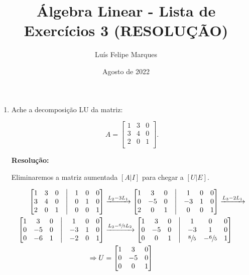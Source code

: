 \documentclass[leqno]{article}
\title{Álgebra Linear - Lista de Exercícios 3 (RESOLUÇÃO)}
\author{Luís Felipe Marques}
\date{Agosto de 2022}
\begin{document}
 
\maketitle

\begin{enumerate}
    \item Ache a decomposição LU da matriz:
    
    $$A=\begin{bmatrix}
    1 & 3 & 0\\
    3 & 4 & 0\\
    2 & 0 & 1\\
    \end{bmatrix}\text{.}$$
    
    \textbf{Resolução:}

    Eliminaremos a matriz aumentada $[A|I]$ para chegar a $[U|E]$.
    
    \begin{align*}
    \begin{bmatrix}
    1 & 3 & 0 & \bigm| & 1 & 0 & 0\\
    3 & 4 & 0 & \bigm| & 0 & 1 & 0\\
    2 & 0 & 1 & \bigm| & 0 & 0 & 1\\
    \end{bmatrix}&\xrightarrow{L_2-3L_1}\begin{bmatrix}
    1 & 3 & 0 & \bigm| & 1 & 0 & 0\\
    0 & -5 & 0 & \bigm| & -3 & 1 & 0\\
    2 & 0 & 1 & \bigm| & 0 & 0 & 1\\
    \end{bmatrix}\xrightarrow{L_3-2L_1}\\
    \begin{bmatrix}
    1 & 3 & 0 & \bigm| & 1 & 0 & 0\\
    0 & -5 & 0 & \bigm| & -3 & 1 & 0\\
    0 & -6 & 1 & \bigm| & -2 & 0 & 1\\
    \end{bmatrix}&\xrightarrow{L_3-\sfrac{6}{5}L_2}\begin{bmatrix}
    1 & 3 & 0 & \bigm| & 1 & 0 & 0\\
    0 & -5 & 0 & \bigm| & -3 & 1 & 0\\
    0 & 0 & 1 & \bigm| & \sfrac{8}{5} & -\sfrac{6}{5} & 1\\
    \end{bmatrix}\\
    \Rightarrow U&=\begin{bmatrix}
    1 & 3 & 0\\
    0 & -5 & 0\\
    0 & 0 & 1\\
    \end{bmatrix}
    \end{align*}
    

\end{enumerate}
\end{document}
